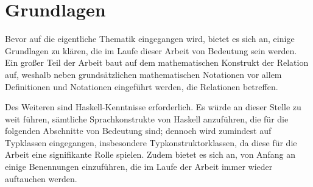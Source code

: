 \section{Grundlagen}


\label{sec:grundlagen}

Bevor auf die eigentliche Thematik eingegangen wird, bietet es sich an, einige Grundlagen zu klären, die im Laufe dieser Arbeit
von Bedeutung sein werden. Ein großer Teil der Arbeit baut auf dem mathematischen Konstrukt der Relation auf, weshalb neben
grundsätzlichen mathematischen Notationen vor allem Definitionen und Notationen eingeführt werden, die Relationen betreffen.

Des Weiteren sind Haskell-Kenntnisse erforderlich. Es würde an dieser Stelle zu weit führen, sämtliche Sprachkonstrukte von
Haskell anzuführen, die für die folgenden Abschnitte von Bedeutung sind; dennoch wird zumindest auf Typklassen eingegangen, insbesondere Typkonstruktorklassen,
da diese für die Arbeit eine signifikante Rolle spielen. Zudem bietet es sich an, von Anfang an einige Benennungen einzuführen, die im Laufe der
Arbeit immer wieder auftauchen werden.




